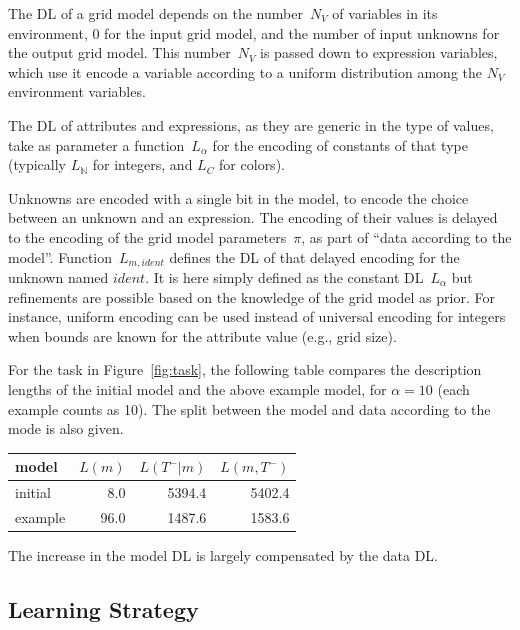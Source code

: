 \documentclass[a4paper]{llncs}
\newcommand{\nat}{\mathbb{N}}
\begin{document}
The DL of a grid model depends on the number~$N_V$ of variables in its
environment, 0 for the input grid model, and the number of input
unknowns for the output grid model. This number~$N_V$ is passed down
to expression variables, which use it encode a variable according to a
uniform distribution among the $N_V$ environment variables.

The DL of attributes and expressions, as they are generic in the type
of values, take as parameter a function~$L_\alpha$ for the encoding of
constants of that type (typically $L_\nat$ for integers, and $L_C$ for
colors).

Unknowns are encoded with a single bit in the model, to encode the
choice between an unknown and an expression. The encoding of their
values is delayed to the encoding of the grid model parameters~$\pi$,
as part of ``data according to the model''.  Function~$L_{m,ident}$
defines the DL of that delayed encoding for the unknown named
$ident$. It is here simply defined as the constant DL~$L_\alpha$ but
refinements are possible based on the knowledge of the grid model as
prior. For instance, uniform encoding can be used instead of universal
encoding for integers when bounds are known for the attribute value
(e.g., grid size).

For the task in Figure~\ref{fig:task}, the following table compares
the description lengths of the initial model and the above example
model, for $\alpha=10$ (each example counts as 10). The split between
the model and data according to the mode is also given.

\begin{center}
  \begin{tabular}{|l|r|r|r|}
    \hline
    model & $L(m)$ & $L(T^-|m)$ & $L(m,T^-)$ \\
    \hline
    initial & 8.0 & 5394.4 & 5402.4 \\
    example & 96.0 & 1487.6 & 1583.6 \\
    \hline
  \end{tabular}
\end{center}

The increase in the model DL is largely compensated by the data DL.


\subsection{Learning Strategy}
\end{document}
